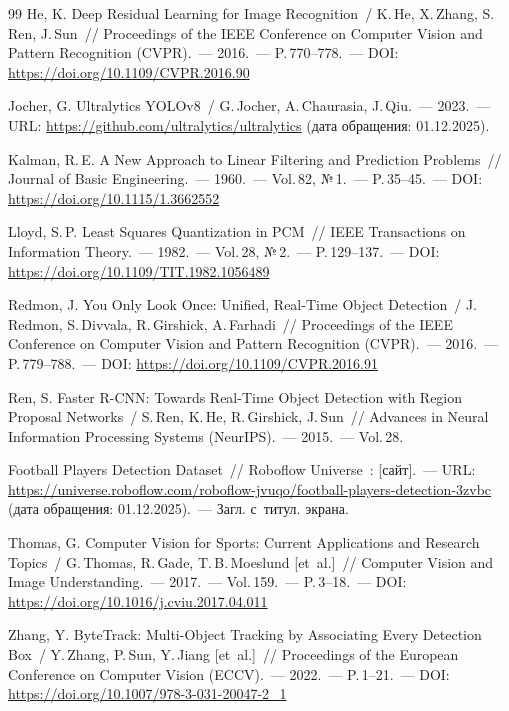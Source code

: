 \documentclass{stud-conf-pmk}
\begin{document}
\begin{paper}
\begin{thebibliography}{99}
He, K. Deep Residual Learning for Image Recognition~/ K.\,He, X.\,Zhang, S.\,Ren, J.\,Sun~// Proceedings of the IEEE Conference on Computer Vision and Pattern Recognition (CVPR).~--- 2016.~--- P.\,770--778.~--- DOI: \url{https://doi.org/10.1109/CVPR.2016.90}

Jocher, G. Ultralytics YOLOv8~/ G.\,Jocher, A.\,Chaurasia, J.\,Qiu.~--- 2023.~--- URL: \url{https://github.com/ultralytics/ultralytics} (дата обращения: 01.12.2025).

Kalman, R.\,E. A New Approach to Linear Filtering and Prediction Problems~// Journal of Basic Engineering.~--- 1960.~--- Vol.\,82, №\,1.~--- P.\,35--45.~--- DOI: \url{https://doi.org/10.1115/1.3662552}

Lloyd, S.\,P. Least Squares Quantization in PCM~// IEEE Transactions on Information Theory.~--- 1982.~--- Vol.\,28, №\,2.~--- P.\,129--137.~--- DOI: \url{https://doi.org/10.1109/TIT.1982.1056489}

Redmon, J. You Only Look Once: Unified, Real-Time Object Detection~/ J.\,Redmon, S.\,Divvala, R.\,Girshick, A.\,Farhadi~// Proceedings of the IEEE Conference on Computer Vision and Pattern Recognition (CVPR).~--- 2016.~--- P.\,779--788.~--- DOI: \url{https://doi.org/10.1109/CVPR.2016.91}

Ren, S. Faster R-CNN: Towards Real-Time Object Detection with Region Proposal Networks~/ S.\,Ren, K.\,He, R.\,Girshick, J.\,Sun~// Advances in Neural Information Processing Systems (NeurIPS).~--- 2015.~--- Vol.\,28.

Football Players Detection Dataset~// Roboflow Universe~: [сайт].~--- URL: \url{https://universe.roboflow.com/roboflow-jvuqo/football-players-detection-3zvbc} (дата обращения: 01.12.2025).~--- Загл. с~титул. экрана.

Thomas, G. Computer Vision for Sports: Current Applications and Research Topics~/ G.\,Thomas, R.\,Gade, T.\,B.\,Moeslund [et~al.]~// Computer Vision and Image Understanding.~--- 2017.~--- Vol.\,159.~--- P.\,3--18.~--- DOI: \url{https://doi.org/10.1016/j.cviu.2017.04.011}

Zhang, Y. ByteTrack: Multi-Object Tracking by Associating Every Detection Box~/ Y.\,Zhang, P.\,Sun, Y.\,Jiang [et~al.]~// Proceedings of the European Conference on Computer Vision (ECCV).~--- 2022.~--- P.\,1--21.~--- DOI: \url{https://doi.org/10.1007/978-3-031-20047-2_1}

\end{thebibliography}

\end{paper}
\end{document}
